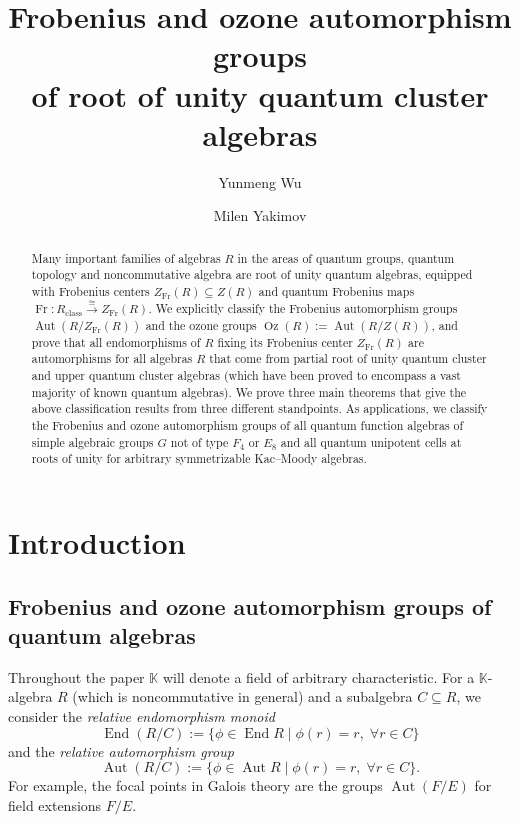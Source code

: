 \documentclass[11pt]{amsart}
\theoremstyle{plain}
\newcommand{\cleqn}{\setcounter{equation}{0}}
\newcommand{\clth}{\setcounter{theorem}{0}}
\newcommand {\sectionnew}[1]{\section{#1}\cleqn\clth}
\newcommand \lb[1]{\label{#1}}
\def \KK {{\mathbb C}}
\def \KK {{\mathbb K}}
\DeclareMathOperator \Aut { {\mathrm{Aut}} }
\DeclareMathOperator \Oz { {\mathrm{Oz}}}
\DeclareMathOperator \End { {\mathrm{End}} }
\DeclareMathOperator \Fr { {\mathrm{Fr}}}
\begin{document}
\title
[Automorphisms of root of unity quantum cluster algebras]
{Frobenius and ozone automorphism groups \\ of root of unity  quantum cluster algebras}
\author[Y. Wu]{Yunmeng Wu}
\address{Department of Mathematics, Northeastern University, Boston, MA 02115} 
\address{}
\author[M. Yakimov]{Milen Yakimov}
\address{
Department of Mathematics, Northeastern University, Boston, MA 02115 and International Center for Mathematical Sciences, Institute of Mathematics and Informatics \\
Bulgarian Academy of Sciences \\ 
Acad. G. Bonchev Str., Bl. 8 \\
Sofia 1113, Bulgaria}
\begin{abstract} Many important families of algebras $R$ in the areas of quantum groups, quantum topology and noncommutative algebra are root of unity quantum algebras, equipped with Frobenius centers $Z_{\Fr}(R) \subseteq Z(R)$ and quantum Frobenius maps $\Fr : R_{\mathrm{class}} \stackrel{\cong}{\longrightarrow} Z_{\Fr}(R)$. We explicitly classify the Frobenius automorphism groups $\Aut(R/Z_{\Fr}(R))$ and the ozone groups $\Oz(R):= \Aut(R/Z(R))$, and prove that all endomorphisms of $R$ fixing its Frobenius center $Z_{\Fr}(R)$ are automorphisms for all algebras $R$ that come from partial root of unity quantum cluster and upper quantum cluster algebras (which have been proved to encompass a vast majority of known quantum algebras). We prove three main theorems that give the above classification results from three different standpoints. As applications, we classify the Frobenius and ozone automorphism groups of all quantum function algebras of simple algebraic groups $G$ not of type $F_4$ or $E_8$ and all quantum unipotent cells at roots of unity for arbitrary symmetrizable Kac--Moody algebras. 
\end{abstract}
\maketitle
\sectionnew{Introduction}
\lb{Intro}
\subsection{Frobenius and ozone automorphism groups of quantum algebras}
\label{1.1}
Throughout the paper $\KK$ will denote a field of arbitrary characteristic. For a $\KK$-algebra $R$ (which is noncommutative in general) and a subalgebra $C \subseteq R$, we consider 
the {\em{relative endomorphism monoid}}
\[
\End(R/C) := \{ \phi \in \End R \mid 
\phi(r) = r, \; \forall r \in C \}
\]
and the {\em{relative automorphism group}}
\[
\Aut(R/C) := \{ \phi \in \Aut R \mid 
\phi(r) = r, \; \forall r \in C \}.
\]
For example, the focal points in Galois theory are the groups $\Aut(F/E)$ for field extensions $F/E$. 
\end{document}
